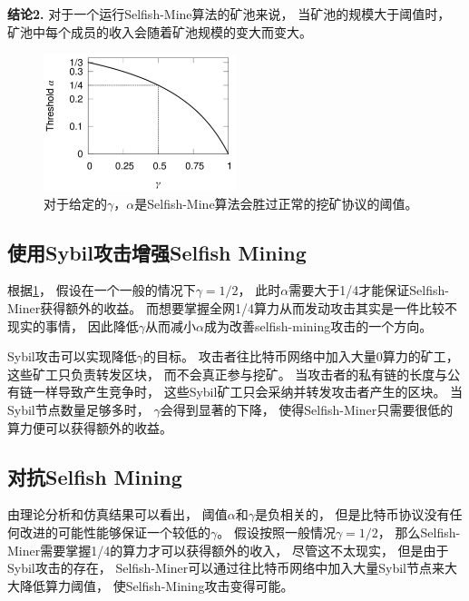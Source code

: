 \documentclass[a4paper, 11pt]{article}
\begin{document}
\begin{CJK*}{UTF8}{gbsn}
    \textbf{结论2.} 对于一个运行Selfish-Mine算法的矿池来说，
    当矿池的规模大于阈值时，
    矿池中每个成员的收入会随着矿池规模的变大而变大。

    \begin{figure}[h]
        \centering
        \includegraphics[width=0.5\textwidth]{figure2}
        \caption{对于给定的$\gamma$，$\alpha$是Selfish-Mine算法会胜过正常的挖矿协议的阈值。}
        \label{figure:figure2}
    \end{figure}
    
    \subsection{使用Sybil攻击增强Selfish Mining}

    根据\ref{figure:figure2}，
    假设在一个一般的情况下$\gamma = 1/2$，
    此时$\alpha$需要大于1/4才能保证Selfish-Miner获得额外的收益。
    而想要掌握全网1/4算力从而发动攻击其实是一件比较不现实的事情，
    因此降低$\gamma$从而减小$\alpha$成为改善selfish-mining攻击的一个方向。

    Sybil攻击可以实现降低$\gamma$的目标。
    攻击者往比特币网络中加入大量0算力的矿工，
    这些矿工只负责转发区块，
    而不会真正参与挖矿。
    当攻击者的私有链的长度与公有链一样导致产生竞争时，
    这些Sybil矿工只会采纳并转发攻击者产生的区块。
    当Sybil节点数量足够多时，
    $\gamma$会得到显著的下降，
    使得Selfish-Miner只需要很低的算力便可以获得额外的收益。

    \subsection{对抗Selfish Mining}

    由理论分析和仿真结果可以看出，
    阈值$\alpha$和$\gamma$是负相关的，
    但是比特币协议没有任何改进的可能性能够保证一个较低的$\gamma$。
    假设按照一般情况$\gamma = 1/2$，
    那么Selfish-Miner需要掌握1/4的算力才可以获得额外的收入，
    尽管这不太现实，
    但是由于Sybil攻击的存在，
    Selfish-Miner可以通过往比特币网络中加入大量Sybil节点来大大降低算力阈值，
    使Selfish-Mining攻击变得可能。


\end{CJK*}
\end{document}
